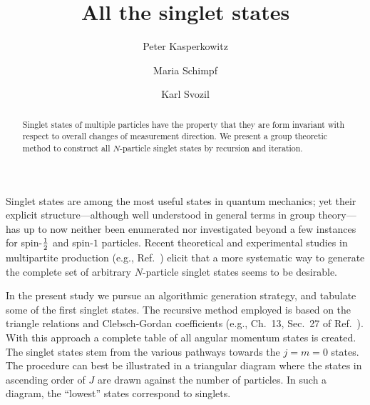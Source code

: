 \documentclass[pra,amsfonts,showpacs,preprint,showkeys]{revtex4}
\begin{document}
\title{All the singlet states}

\author{Peter Kasperkowitz}
\author{Maria Schimpf}
\author{Karl Svozil}


\begin{abstract}
Singlet states of multiple particles have the property that they
are form invariant with respect to overall changes of measurement
direction. We present a group theoretic method to construct all
$N$-particle singlet states by recursion and iteration.
\end{abstract}



\maketitle


Singlet states are among the most useful states in quantum
mechanics; yet their explicit structure---although well understood
in general terms in group theory---has up to now neither been
enumerated nor investigated beyond a few instances for
spin-${1\over 2}$ and spin-$1$ particles. Recent theoretical and
experimental studies in multipartite production (e.g.,
Ref.~\cite{egbkzw}) elicit that a more systematic way to generate
the complete set of arbitrary $N$-particle singlet states seems to
be desirable.

In the present study we pursue an algorithmic generation strategy,
and tabulate some of the first singlet states. The recursive
method employed is based on the triangle relations and
Clebsch-Gordan coefficients (e.g., Ch.~13, Sec.~27 of
Ref.~\cite{messiah-62}). With this approach a complete table of
all angular momentum states is created. The singlet states stem
from the various pathways towards the $j= m=0$ states. The
procedure can best be illustrated in a triangular diagram where
the states in ascending order of $J$ are drawn against the number
of particles. In such a diagram, the ``lowest'' states correspond
to singlets.
\end{document}
